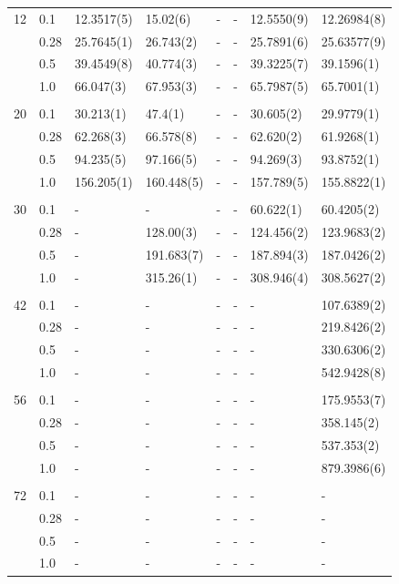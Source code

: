 \begin{table} [H]
\begin{tabularx}{\textwidth}{l:l|XXXXXX}
		12 & 0.1 & 12.3517(5) & 15.02(6) & - & - & 12.5550(9) & 12.26984(8) \\ 
		& 0.28 & 25.7645(1) & 26.743(2) & - & - & 25.7891(6) & 25.63577(9) \\
		& 0.5 & 39.4549(8) & 40.774(3) & - & - & 39.3225(7) & 39.1596(1) \\
		& 1.0 & 66.047(3) & 67.953(3) & - & - & 65.7987(5) & 65.7001(1) \\ \hdashline \\
		
		20 & 0.1 & 30.213(1) & 47.4(1) & - & - & 30.605(2) & 29.9779(1) \\ 
		& 0.28 & 62.268(3) & 66.578(8) & - & - & 62.620(2) & 61.9268(1) \\
		& 0.5 & 94.235(5) & 97.166(5) & - & - & 94.269(3) & 93.8752(1) \\
		& 1.0 & 156.205(1) & 160.448(5) & - & - & 157.789(5) & 155.8822(1) \\ \hdashline \\
		
		30 & 0.1 & - & - & - & - & 60.622(1) & 60.4205(2) \\ 
		& 0.28 & - & 128.00(3) & - & - & 124.456(2) & 123.9683(2) \\
		& 0.5 & - & 191.683(7) & - & - & 187.894(3) & 187.0426(2) \\
		& 1.0 & - & 315.26(1) & - & - & 308.946(4) & 308.5627(2) \\ \hdashline \\
		
		42 & 0.1 & - & - & - & - & - & 107.6389(2) \\ 
		& 0.28 & - & - & - & - & - & 219.8426(2) \\
		& 0.5 & - & - & - & - & - & 330.6306(2) \\
		& 1.0 & - & - & - & - & - & 542.9428(8) \\ \hdashline \\
		
		56 & 0.1 & - & - & - & - & - & 175.9553(7) \\ 
		& 0.28 & - & - & - & - & - & 358.145(2) \\
		& 0.5 & - & - & - & - & - & 537.353(2) \\
		& 1.0 & - & - & - & - & - & 879.3986(6) \\ \hdashline \\
		
		72 & 0.1 & - & - & - & - & - & - \\ 
		& 0.28 & - & - & - & - & - & - \\
		& 0.5 & - & - & - & - & - & - \\
		& 1.0 & - & - & - & - & - & - \\ \hline\hline
	\end{tabularx}
\end{table}

